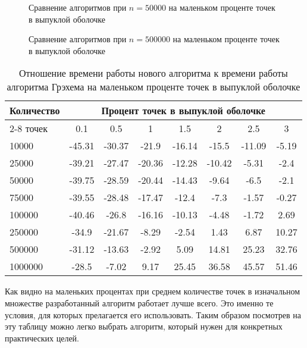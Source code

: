 \begin{figure}[H]
	\centering
	
	\caption{Сравнение алгоритмов при $n = 50000$ на маленьком проценте точек в выпуклой оболочке}
	\label{img:comparison2_50000}
\end{figure}

\begin{figure}[H]
	\centering
	
	\caption{Сравнение алгоритмов при $n = 500000$ на маленьком проценте точек в выпуклой оболочке}
	\label{img:comparison2_500000}
\end{figure}

\begin{table}[H]
	\centering
	\caption{Отношение времени работы нового алгоритма к времени работы алгоритма Грэхема на маленьком проценте точек в выпуклой оболочке}
	\label{table:small_n_ratio}
	\begin{tabular}{|l|c|c|c|c|c|c|c|}
\hline
\multirow{2}{*}{Количество} & \multicolumn{7}{c|}{Процент точек в выпуклой оболочке} \\ \cline{2-8}
точек& 0.1 & 0.5 & 1 & 1.5 & 2 & 2.5 & 3 \\ \hline
10000 & -45.31 & -30.37 & -21.9 & -16.14 & -15.5 & -11.09 & -5.19 \\ \hline
25000 & -39.21 & -27.47 & -20.36 & -12.28 & -10.42 & -5.31 & -2.4 \\ \hline
50000 & -39.75 & -28.59 & -20.44 & -14.43 & -9.64 & -6.5 & -2.1 \\ \hline
75000 & -39.55 & -28.48 & -17.47 & -12.4 & -7.3 & -1.57 & -0.27 \\ \hline
100000 & -40.46 & -26.8 & -16.16 & -10.13 & -4.48 & -1.72 & 2.69 \\ \hline
250000 & -34.9 & -21.67 & -8.29 & -2.54 & 1.43 & 6.87 & 10.27 \\ \hline
500000 & -31.12 & -13.63 & -2.92 & 5.09 & 14.81 & 25.23 & 32.76 \\ \hline
1000000 & -28.5 & -7.02 & 9.17 & 25.45 & 36.58 & 45.57 & 51.46 \\ \hline
	\end{tabular}
\end{table}

Как видно на маленьких процентах при среднем количестве точек в изначальном множестве разработанный алгоритм работает лучше всего. Это именно те условия, для которых прелагается его использовать. Таким образом посмотрев на эту таблицу можно легко выбрать алгоритм, который нужен для конкретных практических целей.

